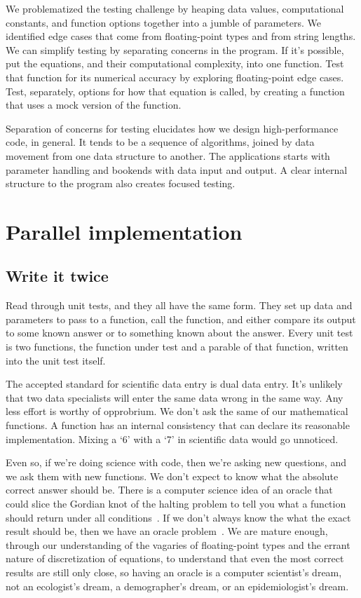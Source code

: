 \documentclass[fleqn,10pt]{olplainarticle}
\begin{document}
We problematized the testing challenge by heaping data values,
computational constants, and function options together into
a jumble of parameters. We identified edge cases that come from
floating-point types and from string lengths. We can simplify
testing by separating concerns in the program. If it's possible,
put the equations, and their computational complexity, into
one function. Test that function for its numerical accuracy by
exploring floating-point edge cases. Test, separately,
options for how that equation is called, by creating a function
that uses a mock version of the function.

Separation of concerns for testing elucidates how we design
high-performance code, in general. It tends to be a sequence
of algorithms, joined by data movement from one data structure
to another. The applications starts with parameter handling
and bookends with data input and output. A clear internal structure
to the program also creates focused testing.


\section{Parallel implementation}\label{sec:parallel-implementation}
\subsection{Write it twice}\label{sec:parallel-twice}
Read through unit tests, and they all have the same form.
They set up data and parameters to pass to a function, call the
function, and either compare its output to some known answer or to
something known about the answer. Every unit test is two
functions, the function under test and a parable
of that function, written into the unit test itself.

The accepted standard for scientific data entry is dual data
entry. It's unlikely that two data specialists will enter
the same data wrong in the same way. Any less effort is
worthy of opprobrium.
We don't ask the same of our mathematical functions. A function
has an internal consistency that can declare its reasonable
implementation. Mixing a `6' with a `7' in scientific data
would go unnoticed.

Even so, if we're doing science with code, then we're asking
new questions, and we ask them with new functions. We don't
expect to know what the absolute correct answer should be.
There is a computer science idea of an oracle that could
slice the Gordian knot of the halting problem to tell you
what a function should return under all
conditions~\citep{howden1986functional}. If we don't always
know the what the exact result should be, then we have an
oracle problem~\citep{sirer1999using}. We are mature enough,
through our understanding of the vagaries of floating-point
types and the errant nature of discretization of equations,
to understand that even the most correct results are still
only close, so having an oracle is a computer scientist's
dream, not an ecologist's dream, a demographer's dream,
or an epidemiologist's dream.
\end{document}
